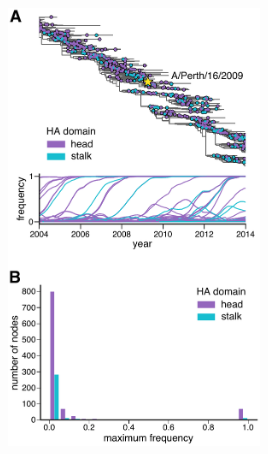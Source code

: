 \documentclass[9pt,twocolumn,twoside]{pnas-new}
\begin{document}
\begin{suppfigure}[H]
\centerline{\includegraphics[width=0.5\textwidth]{figs/supp_head_stalk_mutfreq/head_stalk_mutfreq.pdf}}
\caption{\label{suppfig:head_stalk_mutfreq_supp}
{\bf Frequency trajectories of head and stalk domain mutations.}
(A) This figure repeats the analysis of the H3N2 mutation frequencies in Figure~\ref{fig:frequency_trajectory}, but colors amino-acid mutations by whether they occur in the head (purple) or the stalk (blue) domain.
(B) Histogram of mutation maximum frequencies by the number of nodes for head and stalk domain mutations.
It is clear that mutations in the head domain are more numerous than those in the stalk.
}
\end{suppfigure}
\end{document}
